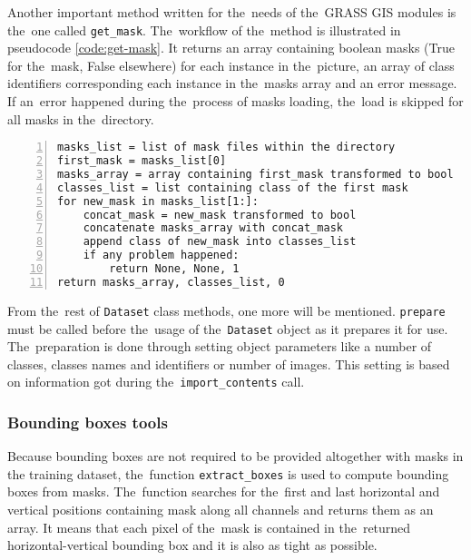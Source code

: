 Another important method written for the~needs of the~GRASS GIS modules is
the~one called \verb|get_mask|. The~workflow of the~method is illustrated in 
pseudocode \ref{code:get-mask}. It returns an array containing boolean masks 
(True for the~mask, False elsewhere) for each instance in the~picture, an array 
of class identifiers corresponding each instance in the~masks array and an error 
message. If an~error happened during the~process of masks loading, the~load is 
skipped for all masks in the~directory.

{\scriptsize
\begin{lstlisting}[style=python, caption={get\_mask}, captionpos=b, 
label=code:get-mask, deletekeywords={class},
backgroundcolor = \color{light-gray}, numbers=left, breaklines=true]
masks_list = list of mask files within the directory
first_mask = masks_list[0]
masks_array = array containing first_mask transformed to bool
classes_list = list containing class of the first mask
for new_mask in masks_list[1:]:
    concat_mask = new_mask transformed to bool
    concatenate masks_array with concat_mask
    append class of new_mask into classes_list
    if any problem happened:
        return None, None, 1
return masks_array, classes_list, 0
\end{lstlisting}}

From the~rest of \verb|Dataset| class methods, one more will be mentioned.
\verb|prepare| must be called before the~usage of
the~\verb|Dataset| object as it prepares it for use. The~preparation is done through 
setting object parameters like a number of classes, classes names and identifiers 
or number of images. This setting is based on information got during
the~\verb|import_contents| call.

\subsubsection{Bounding boxes tools}
\label{bbox-funcs}

Because bounding boxes are not required to be provided altogether with masks in 
the training dataset, the~function \verb|extract_boxes| is used to compute 
bounding boxes from masks. The~function searches for the~first and last 
horizontal and vertical positions containing mask along all channels and returns 
them as an array. It means that each pixel of the~mask is contained in
the~returned horizontal-vertical bounding box and it is also as tight as possible.

